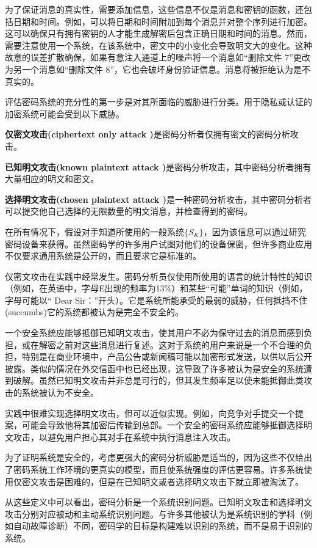 \documentclass[]{article}
\begin{document}
	为了保证消息的真实性，需要添加信息，这些信息不仅是消息和密钥的函数，还包括日期和时间。例如，可以将日期和时间附加到每个消息并对整个序列进行加密。这可以确保只有拥有密钥的人才能生成解密后包含正确日期和时间的消息。然而，需要注意使用一个系统，在该系统中，密文中的小变化会导致明文大的变化。这种故意的误差扩散确保，如果有意注入通道上的噪声将一个消息如“删除文件 7”更改为另一个消息如“删除文件 8”，它也会破坏身份验证信息。消息将被拒绝认为是不真实的。
	
	评估密码系统的充分性的第一步是对其所面临的威胁进行分类。用于隐私或认证的加密系统可能会受到以下威胁。
	
	\textbf{仅密文攻击(ciphertext only attack )}是密码分析者仅拥有密文的密码分析攻击。
	
	\textbf{已知明文攻击(known plaintext attack )}是密码分析攻击，其中密码分析者拥有大量相应的明文和密文。
	
	\textbf{选择明文攻击(chosen plaintext attack )}是一种密码分析攻击，其中密码分析者可以提交他自己选择的无限数量的明文消息，并检查得到的密码。
	
	在所有情况下，假设对手知道所使用的一般系统$\{S_K\}$，因为该信息可以通过研究密码设备来获得。虽然密码学的许多用户试图对他们的设备保密，但许多商业应用不仅要求通用系统是公开的，而且要求它是标准的。
	
	仅密文攻击在实践中经常发生。密码分析员仅使用所使用的语言的统计特性的知识（例如，在英语中，字母E出现的频率为13\%）和某些“可能”单词的知识（例如，字母可能以“ Dear Sir：”开头）。它是系统所能承受的最弱的威胁，任何抵挡不住(succumbs)它的系统都被认为是完全不安全的。
	
	
	一个安全系统应能够抵御已知明文攻击，使其用户不必为保守过去的消息而感到负担，或在解密之前对这些消息进行复述。这对于系统的用户来说是一个不合理的负担，特别是在商业环境中，产品公告或新闻稿可能以加密形式发送，以供以后公开披露。类似的情况在外交信函中也已经出现，这导致了许多被认为是安全的系统遭到破解。虽然已知明文攻击并非总是可行的，但其发生频率足以使未能抵御此类攻击的系统被认为不安全。
	
	实践中很难实现选择明文攻击，但可以近似实现。例如，向竞争对手提交一个提案，可能会导致他将其加密后传输到总部。一个安全的密码系统应能够抵御选择明文攻击，以避免用户担心其对手在系统中执行消息注入攻击。
	
	为了证明系统是安全的，考虑更强大的密码分析威胁是适当的，因为这些不仅给出了密码系统工作环境的更真实的模型，而且使系统强度的评估更容易。许多系统使用仅密文攻击是困难的，但是在已知明文或者选择明文攻击下就立即被淘汰了。
	
	从这些定义中可以看出，密码分析是一个系统识别问题。已知明文攻击和选择明文攻击分别对应被动和主动系统识别问题。与许多其他被认为是系统识别的学科（例如自动故障诊断）不同，密码学的目标是构建难以识别的系统，而不是易于识别的系统。
	
\end{document}
